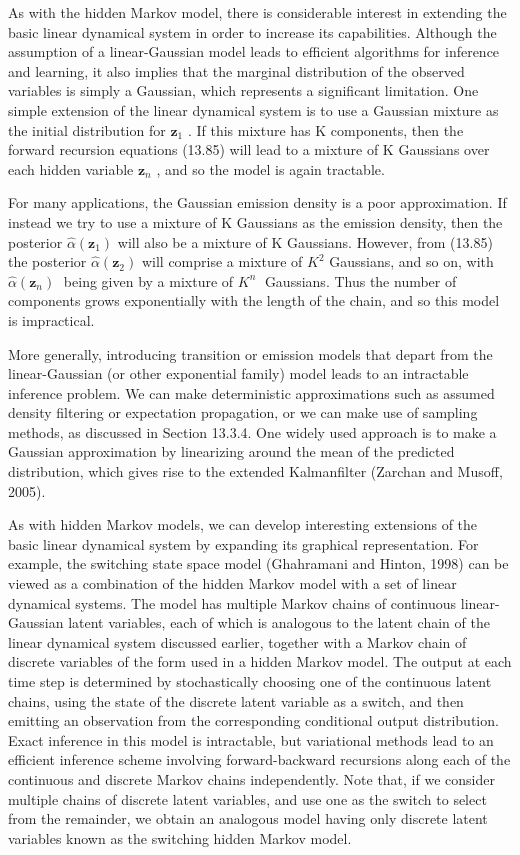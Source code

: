 \documentclass[
  10
]{article}
\begin{document}
As with the hidden Markov model, there is considerable interest in
extending the basic linear dynamical system in order to increase its
capabilities. Although the assumption of a linear-Gaussian model leads
to efficient algorithms for inference and learning, it also implies that
the marginal distribution of the observed variables is simply a
Gaussian, which represents a significant limitation. One simple
extension of the linear dynamical system is to use a Gaussian mixture as
the initial distribution for \(\mathbf { z } _ { 1 }\) . If this mixture
has K components, then the forward recursion equations (13.85) will lead
to a mixture of K Gaussians over each hidden variable
\(\mathbf { z } _ { n }\) , and so the model is again tractable.

For many applications, the Gaussian emission density is a poor
approximation. If instead we try to use a mixture of K Gaussians as the
emission density, then the posterior
\(\widehat { \alpha } ( \mathbf { z } _ { 1 } )\) will also be a mixture
of K Gaussians. However, from (13.85) the posterior
\(\widehat { \alpha } ( \mathbf { z } _ { 2 } )\) will comprise a
mixture of \(K ^ { 2 }\) Gaussians, and so on, with
\(\widehat { \alpha } ( \mathbf { z } _ { n } )\) being given by a
mixture of \(K ^ { n }\) Gaussians. Thus the number of components grows
exponentially with the length of the chain, and so this model is
impractical.

More generally, introducing transition or emission models that depart
from the linear-Gaussian (or other exponential family) model leads to an
intractable inference problem. We can make deterministic approximations
such as assumed density filtering or expectation propagation, or we can
make use of sampling methods, as discussed in Section 13.3.4. One widely
used approach is to make a Gaussian approximation by linearizing around
the mean of the predicted distribution, which gives rise to the extended
Kalmanfilter (Zarchan and Musoff, 2005).

As with hidden Markov models, we can develop interesting extensions of
the basic linear dynamical system by expanding its graphical
representation. For example, the switching state space model (Ghahramani
and Hinton, 1998) can be viewed as a combination of the hidden Markov
model with a set of linear dynamical systems. The model has multiple
Markov chains of continuous linear-Gaussian latent variables, each of
which is analogous to the latent chain of the linear dynamical system
discussed earlier, together with a Markov chain of discrete variables of
the form used in a hidden Markov model. The output at each time step is
determined by stochastically choosing one of the continuous latent
chains, using the state of the discrete latent variable as a switch, and
then emitting an observation from the corresponding conditional output
distribution. Exact inference in this model is intractable, but
variational methods lead to an efficient inference scheme involving
forward-backward recursions along each of the continuous and discrete
Markov chains independently. Note that, if we consider multiple chains
of discrete latent variables, and use one as the switch to select from
the remainder, we obtain an analogous model having only discrete latent
variables known as the switching hidden Markov model.
\end{document}
